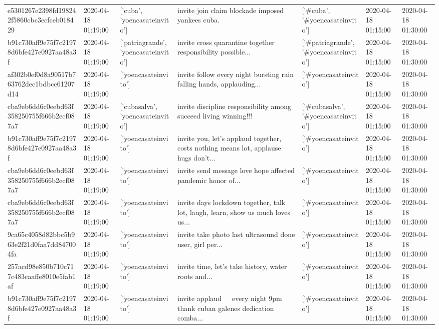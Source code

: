 \begin{tabular}{lllllll}
e5301267e2398fd198242f5860cbc3ecfceb018429 & 2020-04-18 01:19:00 & ['cuba', 'yoencasateinvito'] & invite join claim blockade imposed yankees cuba. & ['#cuba', '#yoencasateinvito'] & 2020-04-18 01:15:00 & 2020-04-18 01:30:00 \\
b91c730aff9e75f7c21978d6bfe427e0927aa48a3f & 2020-04-18 01:19:00 & ['patriagrande', 'yoencasateinvito'] & invite cross quarantine together responsibility possible... & ['#patriagrande', '#yoencasateinvito'] & 2020-04-18 01:15:00 & 2020-04-18 01:30:00 \\
af302b0ef0d8a90517b763762dec1bdbcc61207d14 & 2020-04-18 01:19:00 & ['yoencasateinvito'] & invite follow every night bursting rain falling hands, applauding... & ['#yoencasateinvito'] & 2020-04-18 01:15:00 & 2020-04-18 01:30:00 \\
cba9eb6dd6c0eebd63f358250755f666b2ecf087a7 & 2020-04-18 01:19:00 & ['cubasalva', 'yoencasateinvito'] & invite discipline responsibility among succeed living winning!!! & ['#cubasalva', '#yoencasateinvito'] & 2020-04-18 01:15:00 & 2020-04-18 01:30:00 \\
b91c730aff9e75f7c21978d6bfe427e0927aa48a3f & 2020-04-18 01:19:00 & ['yoencasateinvito'] & invite you, let's applaud together, costs nothing means lot, applause hugs don't... & ['#yoencasateinvito'] & 2020-04-18 01:15:00 & 2020-04-18 01:30:00 \\
cba9eb6dd6c0eebd63f358250755f666b2ecf087a7 & 2020-04-18 01:19:00 & ['yoencasateinvito'] & invite send message love hope affected pandemic honor of... & ['#yoencasateinvito'] & 2020-04-18 01:15:00 & 2020-04-18 01:30:00 \\
cba9eb6dd6c0eebd63f358250755f666b2ecf087a7 & 2020-04-18 01:19:00 & ['yoencasateinvito'] & invite days lockdown together, talk lot, laugh, learn, show us much loves us... & ['#yoencasateinvito'] & 2020-04-18 01:15:00 & 2020-04-18 01:30:00 \\
9ca65c4058d82bbc5b963e2f21d0faa7dd847004fa & 2020-04-18 01:19:00 & ['yoencasateinvito'] & invite take photo last ultrasound done user, girl per... & ['#yoencasateinvito'] & 2020-04-18 01:15:00 & 2020-04-18 01:30:00 \\
257acd98e850b710c717c483caaffe8010e5fab1af & 2020-04-18 01:19:00 & ['yoencasateinvito'] & invite time, let's take history, water roots and... & ['#yoencasateinvito'] & 2020-04-18 01:15:00 & 2020-04-18 01:30:00 \\
b91c730aff9e75f7c21978d6bfe427e0927aa48a3f & 2020-04-18 01:19:00 & ['yoencasateinvito'] & invite applaud 👏👏👏 every night 9pm thank cuban galenes dedication comba... & ['#yoencasateinvito'] & 2020-04-18 01:15:00 & 2020-04-18 01:30:00 \\

\end{tabular}
